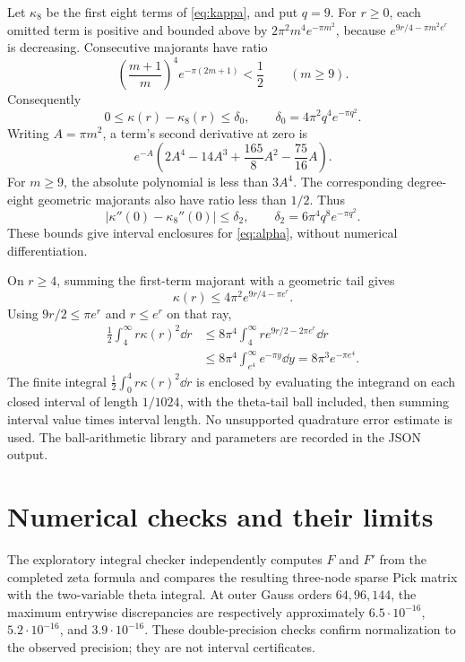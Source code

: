 \documentclass[11pt,letterpaper]{article}
\theoremstyle{remark}\newtheorem{remark}[theorem]{Remark}
\numberwithin{equation}{section}
\begin{document}
Let $\kappa_8$ be the first eight terms of \eqref{eq:kappa}, and put $q=9$. For $r\ge0$, each omitted term is positive and bounded above by $2\pi^2m^4e^{-\pi m^2}$, because $e^{9r/4-\pi m^2e^r}$ is decreasing. Consecutive majorants have ratio
\[
\left(\frac{m+1}{m}\right)^4e^{-\pi(2m+1)}<\frac12\qquad(m\ge9).
\]
Consequently
\begin{equation}
0\le\kappa(r)-\kappa_8(r)\le\delta_0,
\qquad \delta_0=4\pi^2q^4e^{-\pi q^2}.
\end{equation}
Writing $A=\pi m^2$, a term's second derivative at zero is
\[
e^{-A}\left(2A^4-14A^3+\frac{165}{8}A^2-\frac{75}{16}A\right).
\]
For $m\ge9$, the absolute polynomial is less than $3A^4$. The corresponding degree-eight geometric majorants also have ratio less than $1/2$. Thus
\[
|\kappa''(0)-\kappa_8''(0)|\le\delta_2,
\qquad \delta_2=6\pi^4q^8e^{-\pi q^2}.
\]
These bounds give interval enclosures for \eqref{eq:alpha}, without numerical differentiation.

On $r\ge4$, summing the first-term majorant with a geometric tail gives
\[
\kappa(r)\le4\pi^2e^{9r/4-\pi e^r}.
\]
Using $9r/2\le\pi e^r$ and $r\le e^r$ on that ray,
\begin{align*}
\frac12\int_4^\infty r\kappa(r)^2\dd r
&\le8\pi^4\int_4^\infty r e^{9r/2-2\pi e^r}\dd r\\
&\le8\pi^4\int_{e^4}^\infty e^{-\pi y}\dd y
=8\pi^3e^{-\pi e^4}.
\end{align*}
The finite integral $\frac12\int_0^4r\kappa(r)^2\dd r$ is enclosed by evaluating the integrand on each closed interval of length $1/1024$, with the theta-tail ball included, then summing interval value times interval length. No unsupported quadrature error estimate is used. The ball-arithmetic library and parameters are recorded in the JSON output.

\section{Numerical checks and their limits}

The exploratory integral checker independently computes $F$ and $F'$ from the completed zeta formula and compares the resulting three-node sparse Pick matrix with the two-variable theta integral. At outer Gauss orders $64,96,144$, the maximum entrywise discrepancies are respectively approximately $6.5\cdot10^{-16}$, $5.2\cdot10^{-16}$, and $3.9\cdot10^{-16}$. These double-precision checks confirm normalization to the observed precision; they are not interval certificates.
\end{document}
